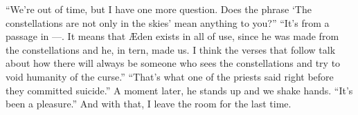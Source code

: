 \documentclass[a4paper, 12pt]{book}
\newcommand\tab[1][1cm]{\hspace*{#1}}
\newcommand\nextline{\newline\tab}
\begin{document}
\nextline
``We're out of time, but I have one more question. Does the phrase `The constellations are not only in the skies' mean anything to you?''
\nextline
``It's from a passage in ---. It means that Æden exists in all of use, since he was made from the constellations and he, in tern, made us. I think the verses that follow talk about how there will always be someone who sees the constellations and try to void humanity of the curse.''
\nextline
``That's what one of the priests said right before they committed suicide.'' A moment later, he stands up and we shake hands. ``It's been a pleasure.'' And with that, I leave the room for the last time.
\end{document}
